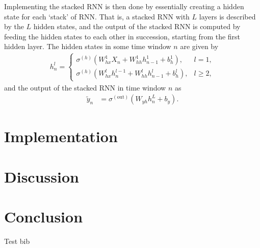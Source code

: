 \documentclass[%
reprint,
amsmath,amssymb,
aps,
]{revtex4-2}
\begin{document}
Implementing the stacked RNN is then done by essentially creating a hidden state for each `stack' of RNN. That is, a stacked RNN with \(L\) layers is described by the \(L\) hidden states, and the output of the stacked RNN is computed by feeding the hidden states to each other in succession, starting from the first hidden layer. The hidden states in some time window \(n\) are given by
\begin{align}
	h^{l}_{n} = \begin{cases}
		\sigma^{(h)}\left( W_{hx}^{1}X_{n} + W_{hh}^{1}h_{n-1}^{1} + b_{h}^{1}\right), &l=1, \\
		\sigma^{(h)}\left( W_{hx}^{l}h_{n}^{l-1} + W_{hh}^{l}h_{n-1}^{l} + b_{h}^{l}\right), &l\geq 2,
	\end{cases}
\end{align}	
and the output of the stacked RNN in time window \(n\) as
\begin{align}
	\tilde{y}_{n} &= \sigma^{(\text{out})}\left( W_{yh}h^{L}_{n} + b_{y} \right).
\end{align}
\section{Implementation}

\section{Discussion}

\section{Conclusion}
Test bib \cite{Planck:2018vyg}



	
\end{document}
